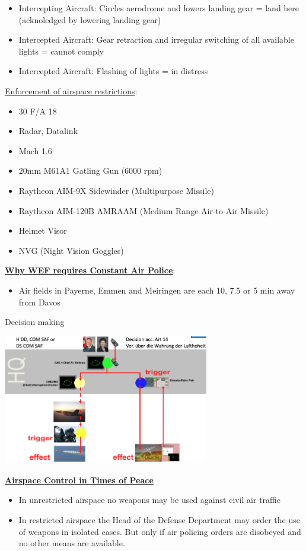 \documentclass[9pt, landscape, fleqn]{scrartcl}
\begin{document}
\begin{multicols*}{3}
\begin{itemize}
    \item Intercepting Aircraft: Circles aerodrome and lowers landing gear = land here (acknoledged by lowering landing gear)
    \item Intercepted Aircraft: Gear retraction and irregular switching of all available lights = cannot comply 
    \item Intercepted Aircraft: Flashing of lights = in distress
\end{itemize}
\underline{Enforcement of airspace restrictions}:
\begin{itemize}
    \item 30 F/A 18
    \item Radar, Datalink
    \item Mach 1.6
    \item 20mm  M61A1 Gatling Gun (6000 rpm)
    \item Raytheon AIM-9X Sidewinder (Multipurpose Missile)
    \item Raytheon AIM-120B AMRAAM (Medium Range Air-to-Air Missile)
    \item Helmet Visor 
    \item NVG (Night Vision Goggles)
\end{itemize}
\underline{\textbf{Why WEF requires Constant Air Police}}:
\begin{itemize}
    \item Air fields in Payerne, Emmen and Meiringen are each 10, 7.5 or 5 min away from Davos  
\end{itemize}
Decision making 
\begin{center}
    \includegraphics[width=9cm]{Images/Decision_Making_CH_Army.png}
\end{center}
\underline{\textbf{Airspace Control in Times of Peace}}
\begin{itemize}
    \item In unrestricted airspace no weapons may be used against civil air traffic 
    \item In restricted airspace the Head of the Defense Department may order the use of weapons in isolated cases. But only if air policing orders are disobeyed and no other means are available.

\end{itemize}
\end{multicols*}
\end{document}
